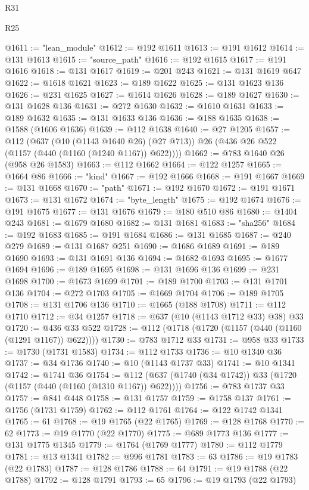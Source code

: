 \begin{lexlean}{R31}
\begin{lexlean}{R25}
\begin{coremodule}
{{{{{{{{{{{{{{{{{{{{{{{{{{{{{{{{{{{{{{{{{{{{{{{{{{{{{{{{{{{{{{{{{{{{{{{{{{{{{{{{{{{{{{{{{{{{{{{{{{{{{{{{{{{{{{{{{{{{{{{{{{{{{{{{{{{{{{{{{{{{{{{{{{{{{{{{{{{{{{{{{{{{{{{{{{{{{{{{{{{{{{{{{{{{{{{{{{{{{{{@1611 := "lean_module"
@1612 := @192 @1611
@1613 := @191 @1612
@1614 := @131 @1613
@1615 := "source_path"
@1616 := @192 @1615
@1617 := @191 @1616
@1618 := @131 @1617
@1619 := @201 @243
@1621 := @131 @1619 @647
@1622 := @1618 @1621
@1623 := @189 @1622
@1625 := @131 @1623 @136
@1626 := @231 @1625
@1627 := @1614 @1626
@1628 := @189 @1627
@1630 := @131 @1628 @136
@1631 := @272 @1630
@1632 := @1610 @1631
@1633 := @189 @1632
@1635 := @131 @1633 @136
@1636 := @188 @1635
@1638 := @1588 (@1606 @1636)
@1639 := @112 @1638
@1640 := @27 @1205
@1657 := @112
    (@637
      (@10 (@1143 @1640 @26) (@27 @713))
      @26
      (@436 @26 @522 (@1157 (@440 (@1160 (@1240 @1167)) @622))))
@1662 := @783 @1640 @26 (@958 @26 @1583)
@1663 := @112 @1662
@1664 := @122 @1257
@1665 := @1664 @86
@1666 := "kind"
@1667 := @192 @1666
@1668 := @191 @1667
@1669 := @131 @1668
@1670 := "path"
@1671 := @192 @1670
@1672 := @191 @1671
@1673 := @131 @1672
@1674 := "byte_length"
@1675 := @192 @1674
@1676 := @191 @1675
@1677 := @131 @1676
@1679 := @180 @510 @86
@1680 := @1404 @243
@1681 := @1679 @1680
@1682 := @131 @1681
@1683 := "sha256"
@1684 := @192 @1683
@1685 := @191 @1684
@1686 := @131 @1685
@1687 := @240 @279
@1689 := @131 @1687 @251
@1690 := @1686 @1689
@1691 := @189 @1690
@1693 := @131 @1691 @136
@1694 := @1682 @1693
@1695 := @1677 @1694
@1696 := @189 @1695
@1698 := @131 @1696 @136
@1699 := @231 @1698
@1700 := @1673 @1699
@1701 := @189 @1700
@1703 := @131 @1701 @136
@1704 := @272 @1703
@1705 := @1669 @1704
@1706 := @189 @1705
@1708 := @131 @1706 @136
@1710 := @1665 (@188 @1708)
@1711 := @112 @1710
@1712 := @34 @1257
@1718 := @637 (@10 (@1143 @1712 @33) @38) @33
@1720 := @436 @33 @522
@1728 := @112 (@1718 (@1720 (@1157 (@440 (@1160 (@1291 @1167)) @622))))
@1730 := @783 @1712 @33
@1731 := @958 @33
@1733 := @1730 (@1731 @1583)
@1734 := @112 @1733
@1736 := @10 @1340 @36
@1737 := @34 @1736
@1740 := @10 (@1143 @1737 @33)
@1741 := @10 @1341
@1742 := @1741 @36
@1754 := @112 (@637 (@1740 (@34 @1742)) @33 (@1720 (@1157 (@440 (@1160 (@1310 @1167)) @622))))
@1756 := @783 @1737 @33
@1757 := @841 @448
@1758 := @131 @1757
@1759 := @1758 @137
@1761 := @1756 (@1731 @1759)
@1762 := @112 @1761
@1764 := @122 @1742 @1341
@1765 := 61
@1768 := @19 @1765 (@22 @1765)
@1769 := @128 @1768
@1770 := 62
@1773 := @19 @1770 (@22 @1770)
@1775 := @689 @1773 @136
@1777 := @131 @1775 @1345
@1779 := @1764 (@1769 @1777)
@1780 := @112 @1779
@1781 := @13 @1341
@1782 := @996 @1781
@1783 := 63
@1786 := @19 @1783 (@22 @1783)
@1787 := @128 @1786
@1788 := 64
@1791 := @19 @1788 (@22 @1788)
@1792 := @128 @1791
@1793 := 65
@1796 := @19 @1793 (@22 @1793)
}}}}}}}}}}}}}}}}}}}}}}}}}}}}}}}}}}}}}}}}}}}}}}}}}}}}}}}}}}}}}}}}}}}}}}}}}}}}}}}}}}}}}}}}}}}}}}}}}}}}}}}}}}}}}}}}}}}}}}}}}}}}}}}}}}}}}}}}}}}}}}}}}}}}}}}}}}}}}}}}}}}}}}}}}}}}}}}}}}}}}}}}}}}}}}}}}}}}}}}
\end{coremodule}
\end{lexlean}
\end{lexlean}
